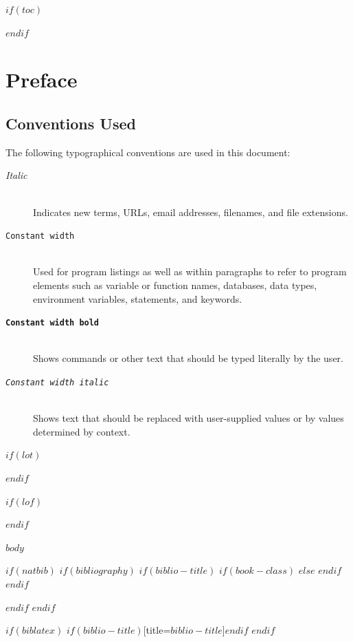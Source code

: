 \documentclass[
    $if(fontsize)$$fontsize$$else$10pt$endif$,
    $if(papersize)$$papersize$$else$letterpaper$endif$,
    titlepage,
    oneside,
    openright,
    $if(draft)$draft$else$final$endif$,
    article]{memoir}
\providecommand{\tightlist}{%
    \setlength{\itemsep}{0pt}\setlength{\parskip}{0pt}
}
\begin{document}
%
%
$if(toc)$
{
    \cleardoublepage
    \begin{KeepFromToc} %
        \tableofcontents
    \end{KeepFromToc}
    \pagebreak
    \cleardoublepage
}
$endif$

\chapter*{Preface}

\hypertarget{conventions}{%
\section{Conventions Used}\label{conventions}}

The following typographical conventions are used in this document:

\begin{description}
\item[\textnormal{\textit{Italic}}]\hfill \\
Indicates new terms, URLs, email addresses, filenames, and file
extensions.

\item[\textnormal{\texttt{Constant width}}]\hfill \\
Used for program listings as well as within paragraphs to refer to
program elements such as variable or function names, databases, data
types, environment variables, statements, and keywords.

\item[\textbf{\texttt{Constant width bold}}]\hfill \\
Shows commands or other text that should be typed literally by the user.

\item[\textnormal{\texttt{\textit{Constant width italic}}}]\hfill \\
Shows text that should be replaced with user-supplied values or by
values determined by context.
\end{description}

$if(lot)$
    \listoftables
$endif$

$if(lof)$
    \listoffigures
$endif$



\mainmatter
$body$

\appendix

\backmatter

$if(natbib)$
    $if(bibliography)$
        $if(biblio-title)$
            $if(book-class)$
                \renewcommand\bibname{$biblio-title$}
            $else$
                \renewcommand\refname{$biblio-title$}
            $endif$
        $endif$
        
    $endif$
$endif$

$if(biblatex)$
    \printbibliography$if(biblio-title)$[title=$biblio-title$]$endif$
$endif$


\end{document}
